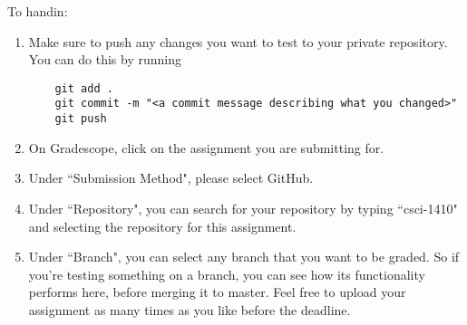 \documentclass{article}
\begin{document}
To handin:
\begin{enumerate}
  \item Make sure to push any changes you want to test to your private
    repository. You can do this by running
    \begin{verbatim}
    git add .
    git commit -m "<a commit message describing what you changed>"
    git push
    \end{verbatim}

  \item On Gradescope, click on the assignment you are submitting for.

  \item Under ``Submission Method", please select GitHub.

  \item Under ``Repository", you can search for your repository by typing ``csci-1410"
    and selecting the repository for this assignment.

  \item Under ``Branch", you can select any branch that you want to be graded. So if
    you're testing something on a branch, you can see how its functionality
    performs here, before merging it to master. Feel free to upload your assignment
    as many times as you like before the deadline.
\end{enumerate}

\end{document}
